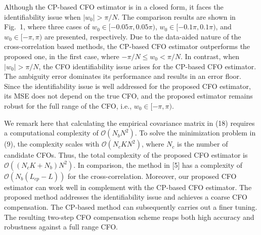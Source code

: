 \documentclass[journal]{IEEEtran}
\begin{document}
Although the CP-based CFO estimator \cite{zhang_channel_2022} is in a closed form, it faces the identifiability issue when $|w_0| > \pi/N$. The comparison results are shown in Fig.~1, where three cases of $w_0 \in [-0.05\pi,0.05\pi) $, $w_0 \in [-0.1\pi,0.1\pi)$, and $w_0 \in [-\pi, \pi)$ %
are presented, respectively. 
Due to the data-aided nature of the cross-correlation based methods, the CP-based CFO estimator outperforms the proposed one, in the first case, where $- \pi/N \le w_0 < \pi/N$. In contrast, when $|w_0| > \pi/N$, the CFO identifiability issue arises for the CP-based CFO estimator. The ambiguity error dominates its performance and results in an error floor. Since the identifiability issue is well addressed for the proposed CFO estimator, its MSE does not depend on the true CFO, and the proposed estimator remains robust for the full range of the CFO, i.e., $w_0 \in [-\pi, \pi)$. %

We remark here that calculating the empirical covariance matrix in (18) requires a computational complexity of \(\mathcal{O}(N_bN^2)\). To solve the minimization problem in (9), the complexity scales with \(\mathcal{O}(N_c K N^2)\), where \(N_c\) is the number of candidate CFOs. Thus, the total complexity of the proposed CFO estimator is \(\mathcal{O}((N_cK + N_b)N^2)\). In comparison, the method in [5] has a complexity of \(\mathcal{O}(N_b(L_{cp}-L))\) for the cross-correlation.
Moreover, our proposed CFO estimator can work well in complement with the CP-based CFO estimator. The proposed method addresses the identifiability issue and achieves a coarse CFO compensation. The CP-based method \cite{zhang_channel_2022} can subsequently carries out a finer tuning. The resulting two-step CFO compensation scheme reaps both high accuracy and robustness against a full range CFO. 
\end{document}
